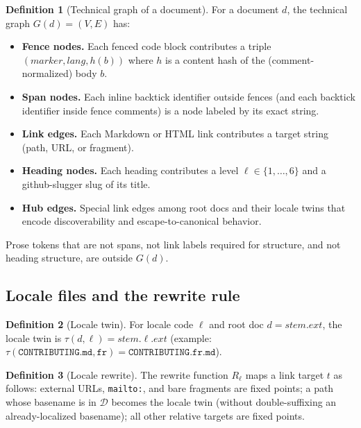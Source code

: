 \documentclass[11pt]{article}
\theoremstyle{definition}
\newtheorem{definition}{Definition}
\theoremstyle{plain}
\theoremstyle{remark}
\begin{document}
\begin{definition}[Technical graph of a document]
\label{def:tech-graph}
For a document $d$, the technical graph $G(d) = (V, E)$ has:
\begin{itemize}[leftmargin=*]
\item \textbf{Fence nodes.} Each fenced code block contributes a triple
  $(\mathit{marker}, \mathit{lang}, h(b))$ where $h$ is a content hash of the
  (comment-normalized) body $b$.
\item \textbf{Span nodes.} Each inline backtick identifier outside fences
  (and each backtick identifier inside fence comments) is a node labeled by
  its exact string.
\item \textbf{Link edges.} Each Markdown or HTML link contributes a target
  string (path, URL, or fragment).
\item \textbf{Heading nodes.} Each heading contributes a level $\ell \in
  \{1,\ldots,6\}$ and a github-slugger slug of its title.
\item \textbf{Hub edges.} Special link edges among root docs and their locale
  twins that encode discoverability and escape-to-canonical behavior.
\end{itemize}
Prose tokens that are not spans, not link labels required for structure, and
not heading structure, are outside $G(d)$.
\end{definition}

\subsection{Locale files and the rewrite rule}

\begin{definition}[Locale twin]
\label{def:twin}
For locale code $\ell$ and root doc $d = \mathit{stem}.\mathit{ext}$, the
locale twin is $\tau(d,\ell) = \mathit{stem}.\ell.\mathit{ext}$ (example:
$\tau(\texttt{CONTRIBUTING.md}, \texttt{fr}) =
\texttt{CONTRIBUTING.fr.md}$).
\end{definition}

\begin{definition}[Locale rewrite]
\label{def:rewrite}
The rewrite function $R_\ell$ maps a link target $t$ as follows: external
URLs, \texttt{mailto:}, and bare fragments are fixed points; a path whose
basename is in $\mathcal{D}$ becomes the locale twin (without double-suffixing
an already-localized basename); all other relative targets are fixed points.
\end{definition}
\end{document}
